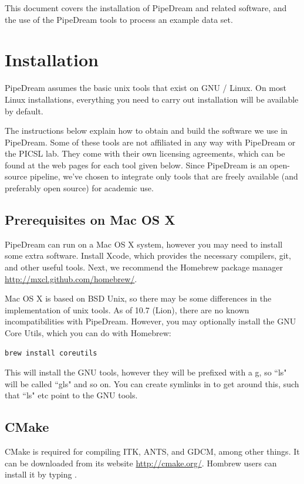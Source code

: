 \documentclass{InsightArticle}
\begin{document}
This document covers the installation of PipeDream and related software, and the use of the PipeDream tools to process an example data set.

\section{Installation}

PipeDream assumes the basic unix tools that exist on GNU / Linux. On most Linux installations, everything you need to carry out installation will be available by default. 

The instructions below explain how to obtain and build the software we use in PipeDream. Some of these tools are not affiliated in any way with PipeDream or the PICSL lab. They come with their own licensing agreements, which can be found at the web pages for each tool given below. Since PipeDream is an open-source pipeline, we've chosen to integrate only tools that are freely available (and preferably open source) for academic use.

\subsection{Prerequisites on Mac OS X}

PipeDream can run on a Mac OS X system, however you may need to install some extra software. Install Xcode, which provides the necessary compilers, git, and other useful tools. Next, we recommend the Homebrew package manager \url{http://mxcl.github.com/homebrew/}. 

Mac OS X is based on BSD Unix, so there may be some differences in the implementation of unix tools. As of 10.7 (Lion), there are no known incompatibilities with PipeDream. However, you may optionally install the GNU Core Utils, which you can do with Homebrew:
\begin{lstlisting}[style=bash]
  brew install coreutils
\end{lstlisting}

This will install the GNU tools, however they will be prefixed with a g, so ``ls" will be called ``gls" and so on. You can create symlinks in  to get around this, such that ``ls" etc point to the GNU tools.    


\subsection{CMake}

CMake is required for compiling ITK, ANTS, and GDCM, among other things. It can be downloaded from its website \url{http://cmake.org/}. Hombrew users can install it by typing .
\end{document}

